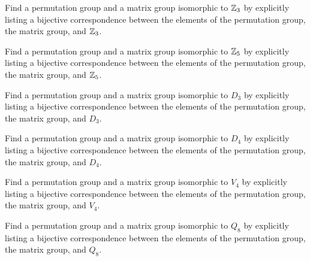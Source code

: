 \documentclass{ximera}
\begin{document}
\begin{exercise}
  Find a permutation group and a matrix group isomorphic to $\mathbb Z_3$ by
  explicitly listing a bijective correspondence between the elements
  of the permutation group, the matrix group, and $\mathbb Z_3$.
\end{exercise}


\begin{exercise}
  Find a permutation group and a matrix group isomorphic to $\mathbb Z_5$ by
  explicitly listing a bijective correspondence between the elements
  of the permutation group, the matrix group, and $\mathbb Z_5$.
\end{exercise}



\begin{exercise}
  Find a permutation group and a matrix group isomorphic to $D_3$ by
  explicitly listing a bijective correspondence between the elements
  of the permutation group, the matrix group, and $D_3$.
\end{exercise}


\begin{exercise}
  Find a permutation group and a matrix group isomorphic to $D_4$ by
  explicitly listing a bijective correspondence between the elements
  of the permutation group, the matrix group, and $D_4$.
\end{exercise}



\begin{exercise}
  Find a permutation group and a matrix group isomorphic to $V_4$ by
  explicitly listing a bijective correspondence between the elements
  of the permutation group, the matrix group, and $V_4$.
\end{exercise}


\begin{exercise}
  Find a permutation group and a matrix group isomorphic to $Q_8$ by
  explicitly listing a bijective correspondence between the elements
  of the permutation group, the matrix group, and $Q_8$.
\end{exercise}
\end{document}
